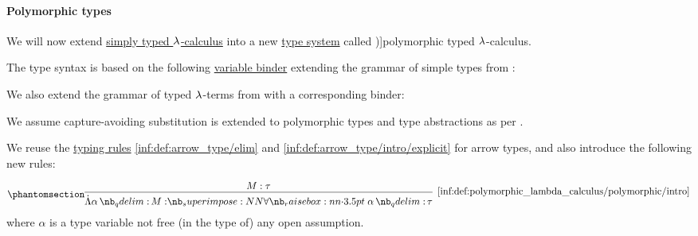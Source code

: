 \paragraph{Polymorphic types}

\begin{definition}\label{def:polymorphic_typed_lambda_calculus}
  We will now extend \hyperref[con:simple_type_theory/arrow]{simply typed \( {\mathrm \lambda} \)-calculus} into a new \hyperref[def:abstract_type_system]{type system} called \term[en=polymorphic typed lambda calculus (\cite[164]{Barendregt1992LambdaCalculiWithTypes})]{polymorphic typed \( {\mathrm \lambda} \)-calculus}.

  The type syntax is based on the following \hyperref[con:variable_binding]{variable binder} extending the grammar of simple types from :
  \begin{bnf*}
     {\bnftsq{\( \synforall \)} \bnfsp {} \bnfsp {} \bnfsp {}}
  \end{bnf*}

  We also extend the grammar of typed \( {\mathrm \lambda} \)-terms from  with a corresponding binder:
  \begin{bnf*}
     {\bnftsq{\( \syn\Lambda \)} \bnfsp {} \bnfsp {} \bnfsp {}}
  \end{bnf*}

  We assume capture-avoiding substitution is extended to polymorphic types and type abstractions as per .

  We reuse the \hyperref[con:typing_rule]{typing rules} \ref{inf:def:arrow_type/elim} and \ref{inf:def:arrow_type/intro/explicit} for arrow types, and also introduce the following new rules:
  \begin{paracol}{2}
    \begin{leftcolumn}
      \ParacolAlignmentHack
      \begin{equation*}\taglabel[\ensuremath{ \forall_+ }]{inf:def:polymorphic_lambda_calculus/polymorphic/intro}
        \begin{prooftree}
          \hypo{ M: \tau }
          \infer1[\ref{inf:def:polymorphic_lambda_calculus/polymorphic/intro}]{ \qAbs \alpha M: \qforall \alpha \tau },
        \end{prooftree}
      \end{equation*}
      where \( \alpha \) is a type variable not free (in the type of) any open assumption.
    \end{leftcolumn}


\end{paracol}
\end{definition}
